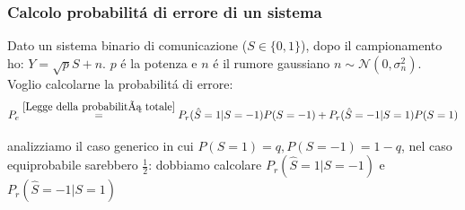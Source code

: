         \subsubsection{Calcolo probabilitá di errore di un sistema} 
            Dato un sistema binario di comunicazione ($S\in\{0,1\}$), dopo il campionamento ho: $Y = \sqrt{p}S+n$. $p$ é la potenza e $n$ é il rumore
            gaussiano $n \sim \mathcal{N}(0,\sigma_n^2)$. Voglio calcolarne la probabilitá di errore:
            \[
                P_e \overset{\ref{Legge della probabilitá totale}}{=} P_r(\hat{S}=1|S=-1)P(S=-1)+ P_r(\hat{S}=-1|S=1)P(S=1)   
            \] 
            \begin{sloppypar}
                \noindent analizziamo il caso generico in cui ${P(S=1) = q, P(S=-1)=1-q}$, nel caso equiprobabile sarebbero $\frac{1}{2}$: dobbiamo calcolare 
                ${P_r(\hat{S}=1|S=-1)}$ e ${P_r(\hat{S}=-1|S=1)}$
            \end{sloppypar}
